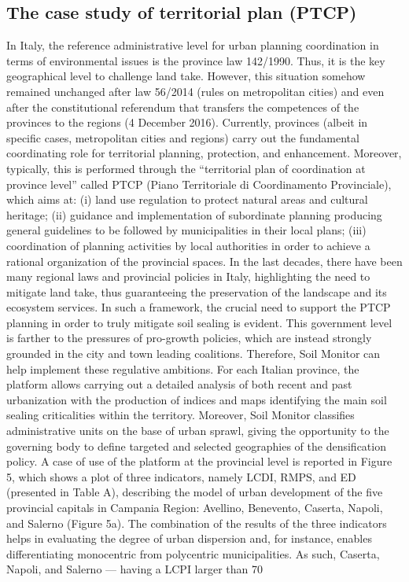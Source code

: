 \documentclass[APA,LATO1COL,doublespace]{WileyNJD-v2}
\begin{document}
\subsection{The case study of territorial plan (PTCP)}
In Italy, the reference administrative level for urban planning coordination in terms of environmental issues is the province law 142/1990. Thus, it is the key geographical level to challenge land take. However, this situation somehow remained unchanged after law 56/2014 (rules on metropolitan cities) and even after the constitutional referendum that transfers the competences of the provinces to the regions (4 December 2016). Currently, provinces (albeit in specific cases, metropolitan cities and regions) carry out the fundamental coordinating role for territorial planning, protection, and enhancement. Moreover, typically, this is performed through the “territorial plan of coordination at province level” called PTCP (Piano Territoriale di Coordinamento Provinciale), which aims at: (i) land use regulation to protect natural areas and cultural heritage; (ii) guidance and implementation of subordinate planning producing general guidelines to be followed by municipalities in their local plans; (iii) coordination of planning activities by local authorities in order to achieve a rational organization of the provincial spaces.
In the last decades, there have been many regional laws and provincial policies in Italy, highlighting the need to mitigate land take, thus guaranteeing the preservation of the landscape and its ecosystem services. In such a framework, the crucial need to support the PTCP planning in order to truly mitigate soil sealing is evident. This government level is farther to the pressures  of pro-growth policies, which are instead strongly grounded in the city and town leading coalitions. Therefore, Soil Monitor can help implement these regulative ambitions. For each Italian province, the platform allows carrying out a detailed analysis of both recent and past urbanization with the production of indices and maps identifying the main soil sealing criticalities within the territory. Moreover, Soil Monitor classifies administrative units on the base of urban sprawl, giving the opportunity to the governing body to define targeted and selected geographies of the densification policy.
A case of use of the platform at the provincial level is reported in Figure 5, which shows a plot of three indicators, namely LCDI, RMPS, and ED (presented in Table A), describing the model of urban development of the five provincial capitals in Campania Region: Avellino, Benevento, Caserta, Napoli, and Salerno (Figure 5a). The combination of the results of the three indicators helps in evaluating the degree of urban dispersion and, for instance, enables differentiating monocentric from polycentric municipalities. As such, Caserta, Napoli, and Salerno — having a LCPI larger than 70%
\end{document}

